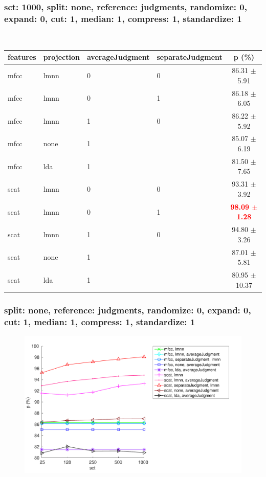 \begin{frame}\frametitle{sct: 1000, split: none, reference: judgments, randomize: 0, expand: 0, cut: 1, median: 1, compress: 1, standardize: 1} 
  
\begin{table} 
\begin{center} 
\ 
 \setlength{\tabcolsep}{.16667em} 
\begin{tabular}{llllc} 
features & projection & averageJudgment & separateJudgment & p (\%) \\ 
\hline 
mfcc & lmnn & 0 & 0 &  86.31 $\pm$5.91 \\ 
mfcc & lmnn & 0 & 1 &  86.18 $\pm$6.05 \\ 
mfcc & lmnn & 1 & 0 &  86.22 $\pm$5.92 \\ 
mfcc & none & 1 &  &  85.07 $\pm$6.19 \\ 
mfcc & lda & 1 &  &  81.50 $\pm$7.65 \\ 
scat & lmnn & 0 & 0 &  93.31 $\pm$3.92 \\ 
scat & lmnn & 0 & 1 & \textbf{\textcolor{red}{ 98.09 $\pm$1.28}} \\ 
scat & lmnn & 1 & 0 &  94.80 $\pm$3.26 \\ 
scat & none & 1 &  &  87.01 $\pm$5.81 \\ 
scat & lda & 1 &  & 80.95 $\pm$10.37 \\ 
\end{tabular} 
\end{center} 
\label{sc1000SpnoRejuRa0Ex0Cu1Me1Co1St1} 
\end{table} 
 
\end{frame}  
  
\begin{frame}\frametitle{\small split: none, reference: judgments, randomize: 0, expand: 0, cut: 1, median: 1, compress: 1, standardize: 1} 
\begin{center} 
\begin{figure} 
\centering 
\includegraphics[width=\textwidth,height=0.8\textheight,keepaspectratio]{./figures/Fig160.pdf} 
\label{spnoRejuRa0Ex0Cu1Me1Co1St1} 
\end{figure} 
\end{center} 
  
  
\end{frame}  
